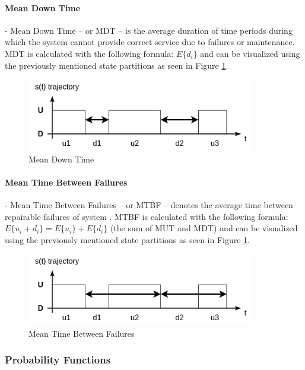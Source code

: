 \paragraph{Mean Down Time} - Mean Down Time -- or MDT -- is the average duration of time periods during which the system cannot provide correct service due to failures or maintenance. MDT is calculated with the following formula: \(E\{d_i\}\) and can be visualized using the previously mentioned state partitions as seen in Figure \ref{fig:mdt}.

\begin{figure}[h]
	\centering
	\includegraphics[width=100mm, keepaspectratio]{figures/MDT.png}
	\caption{ Mean Down Time \cite{DependabilityBMEMIT} }
	\label{fig:mdt}
\end{figure}

\paragraph{Mean Time Between Failures} - Mean Time Between Failures -- or MTBF -- denotes the average time between repairable failures of system \cite{KPIMetrics}. MTBF is calculated with the following formula: \(E\{u_i + d_i\} = E\{u_i\} + E\{d_i\}\) (the sum of MUT and MDT) and can be visualized using the previously mentioned state partitions as seen in Figure \ref{fig:mdt}.

\begin{figure}[h]
	\centering
	\includegraphics[width=100mm, keepaspectratio]{figures/MTBF.png}
	\caption{ Mean Time Between Failures \cite{DependabilityBMEMIT} }
	\label{fig:mtbf}
\end{figure}

\subsubsection{Probability Functions} \label{background-dep-metrics-prob-funcs}

